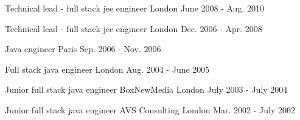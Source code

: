 \begin{cventries}

  \cventry
    {Technical lead - full stack jee engineer} %
    {} %
    {London} %
    {June 2008 - Aug. 2010} %
    {} %
    {}

  \cventry
    {Technical lead - full stack jee engineer} %
    {} %
    {London} %
    {Dec. 2006 - Apr. 2008} %
    {} %
    {}

  \cventry
    {Java engineer} %
    {} %
    {Paris} %
    {Sep. 2006 - Nov. 2006} %
    {} %
    {}

  \cventry
    {Full stack java engineer} %
    {} %
    {London} %
    {Aug. 2004 - June 2005} %
    {} %
    {}

  \cventry
    {Junior full stack java engineer} %
    {BoxNewMedia} %
    {London} %
    {July 2003 - July 2004} %
    {} %
    {}

  \cventry
    {Junior full stack java engineer} %
    {AVS Consulting} %
    {London} %
    {Mar. 2002 - July 2002} %
    {} %
    {}

\end{cventries}
